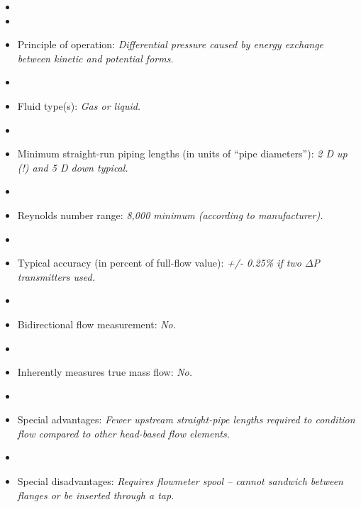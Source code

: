 \documentclass[12pt,a4paper]{article}
\begin{document}
\begin{itemize}
\goodbreak
\item{} 
\vskip 5pt
\item\item{} Principle of operation: {\it Differential pressure caused by energy exchange between kinetic and potential forms.}
\vskip 5pt
\item\item{} Fluid type(s): {\it Gas or liquid.}
\vskip 5pt
\item\item{} Minimum straight-run piping lengths (in units of ``pipe diameters''): {\it 2 D up (!) and 5 D down typical.}
\vskip 5pt
\item\item{} Reynolds number range: {\it 8,000 minimum (according to manufacturer).}
\vskip 5pt
\item\item{} Typical accuracy (in percent of full-flow value): {\it +/- 0.25\% if two $\Delta$P transmitters used.}
\vskip 5pt
\item\item{} Bidirectional flow measurement: {\it No.}
\vskip 5pt
\item\item{} Inherently measures true mass flow: {\it No.}
\vskip 5pt
\item\item{} Special advantages: {\it Fewer upstream straight-pipe lengths required to condition flow compared to other head-based flow elements.}
\vskip 5pt
\item\item{} Special disadvantages: {\it Requires flowmeter spool -- cannot sandwich between flanges or be inserted through a tap.}
\end{itemize}
\end{document}

